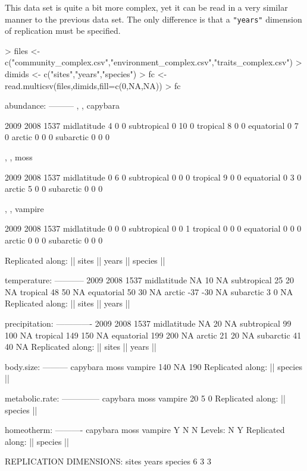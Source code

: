 \documentclass{article}
\newcommand{\code}[1]{\texttt{#1}}
\numberwithin{exercise}{section}
\begin{document}
This data set is quite a bit more complex, yet it can be read in a very similar manner to the previous data set.  The only difference is that a \code{"years"} dimension of replication must be specified.

\begin{Schunk}
\begin{Sinput}
> files <- c("community_complex.csv","environment_complex.csv","traits_complex.csv")
> dimids <- c("sites","years","species")
> fc <- read.multicsv(files,dimids,fill=c(0,NA,NA))
> fc
\end{Sinput}
\begin{Soutput}
abundance:
---------
, , capybara

            2009 2008 1537
midlatitude    4    0    0
subtropical    0   10    0
tropical       8    0    0
equatorial     0    7    0
arctic         0    0    0
subarctic      0    0    0

, , moss

            2009 2008 1537
midlatitude    0    6    0
subtropical    0    0    0
tropical       9    0    0
equatorial     0    3    0
arctic         5    0    0
subarctic      0    0    0

, , vampire

            2009 2008 1537
midlatitude    0    0    0
subtropical    0    0    1
tropical       0    0    0
equatorial     0    0    0
arctic         0    0    0
subarctic      0    0    0

Replicated along:  || sites || years || species || 


temperature:
-----------
            2009 2008 1537
midlatitude   NA   10   NA
subtropical   25   20   NA
tropical      48   50   NA
equatorial    50   30   NA
arctic       -37  -30   NA
subarctic      3    0   NA
Replicated along:  || sites || years || 


precipitation:
-------------
            2009 2008 1537
midlatitude   NA   20   NA
subtropical   99  100   NA
tropical     149  150   NA
equatorial   199  200   NA
arctic        21   20   NA
subarctic     41   40   NA
Replicated along:  || sites || years || 


body.size:
---------
capybara     moss  vampire 
     140       NA      190 
Replicated along:  || species || 


metabolic.rate:
--------------
capybara     moss  vampire 
      20        5        0 
Replicated along:  || species || 


homeotherm:
----------
capybara     moss  vampire 
       Y        N        N 
Levels: N Y
Replicated along:  || species || 


REPLICATION DIMENSIONS: 
  sites   years species 
      6       3       3 
\end{Soutput}
\end{Schunk}
\end{document}
